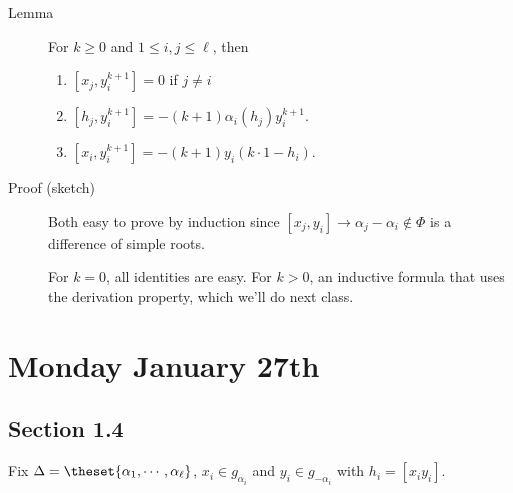 \begin{description}
\item[Lemma]
For \(k\geq 0\) and \(1\leq i, j \leq \ell\), then

\begin{enumerate}
\def\labelenumi{\alph{enumi}.}
\item
  \([x_j, y_i^{k+1}] = 0\) if \(j\neq i\)
\item
  \([h_j, y_i^{k+1}] = -(k+1) \alpha_i(h_j) y_i^{k+1}\).
\item
  \([x_i, y_i^{k+1}] = -(k+1) y_i(k\cdot 1 - h_i)\).
\end{enumerate}
\item[Proof (sketch)]
Both easy to prove by induction since
\([x_j, y_i] \to \alpha_j - \alpha_i \not\in \Phi\) is a difference of
simple roots.

For \(k=0\), all identities are easy. For \(k> 0\), an inductive formula
that uses the derivation property, which we'll do next class.
\end{description}

\hypertarget{monday-january-27th}{%
\section{Monday January 27th}\label{monday-january-27th}}

\hypertarget{section-1.4}{%
\subsection{Section 1.4}\label{section-1.4}}

Fix \(\Delta = \theset{\alpha_1, \cdots, \alpha_\ell}\),
\(x_i \in g_{\alpha_i}\) and \(y_i \in g_{-\alpha_i}\) with
\(h_i = [x_i y_i]\).

